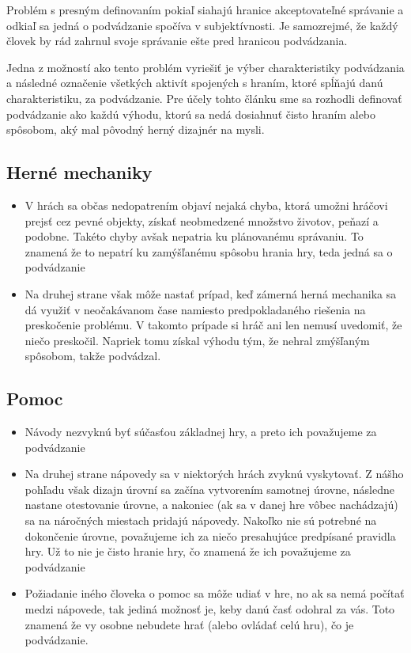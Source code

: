 \documentclass[10pt, oneside, slovak,a4paper]{article}
\begin{document}
Problém s presným definovaním pokiaľ siahajú hranice akceptovateľné správanie a odkiaľ sa jedná o podvádzanie spočíva v subjektívnosti. Je samozrejmé, že každý človek by rád zahrnul svoje správanie ešte pred hranicou podvádzania. %

Jedna z možností ako tento problém vyriešiť je výber charakteristiky podvádzania a následné označenie všetkých aktivít spojených s hraním, ktoré spĺňajú danú charakteristiku, za podvádzanie. Pre účely tohto článku sme sa rozhodli definovať podvádzanie ako každú výhodu, ktorú sa nedá dosiahnuť čisto hraním alebo spôsobom, aký mal pôvodný herný dizajnér na mysli.

\subsection{Herné mechaniky}
\begin{itemize}
\item V hrách sa občas nedopatrením objaví nejaká chyba, ktorá umožni hráčovi prejsť cez pevné objekty, získať neobmedzené množstvo životov, peňazí a podobne. Takéto chyby avšak nepatria ku plánovanému správaniu. To znamená že to nepatrí ku zamýšľanému spôsobu hrania hry, teda jedná sa o podvádzanie

\item Na druhej strane však môže nastať prípad, keď zámerná herná mechanika sa dá využiť v neočakávanom čase namiesto predpokladaného riešenia na preskočenie problému. V takomto prípade si hráč ani len nemusí uvedomiť, že niečo preskočil. Napriek tomu získal výhodu tým, že nehral zmýšľaným spôsobom, takže podvádzal.
\end{itemize}

\subsection{Pomoc}
\begin{itemize}
\item Návody nezvyknú byť súčasťou základnej hry, a preto ich považujeme za podvádzanie
\item Na druhej strane nápovedy sa v niektorých hrách zvyknú vyskytovať. Z nášho pohľadu však dizajn úrovní sa začína vytvorením samotnej úrovne, následne nastane otestovanie úrovne, a nakoniec (ak sa v danej hre vôbec nachádzajú) sa na náročných miestach pridajú nápovedy. Nakoľko nie sú potrebné na dokončenie úrovne, považujeme ich za niečo presahujúce predpísané pravidla hry. Už to nie je čisto hranie hry, čo znamená že ich považujeme za podvádzanie
\item Požiadanie iného človeka o pomoc sa môže udiať v hre, no ak sa nemá počítať medzi nápovede, tak jediná možnosť je, keby danú časť odohral za vás. Toto znamená že vy osobne nebudete hrať (alebo ovládať celú hru), čo je podvádzanie.
\end{itemize}
\end{document}
